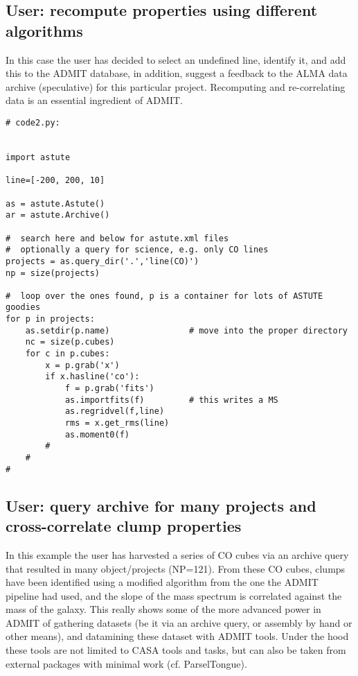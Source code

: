 \documentclass[preprint]{aastex} %
\begin{document}
\subsection{User: recompute properties using different algorithms}

In this case the user has decided to select an undefined line, identify it, 
and add this to the ADMIT database, in addition, suggest a feedback to the ALMA data archive
(speculative) for this particular project.
Recomputing and re-correlating data is an essential ingredient of ADMIT.

\footnotesize
\begin{verbatim}
# code2.py:


import astute

line=[-200, 200, 10]

as = astute.Astute()
ar = astute.Archive()

#  search here and below for astute.xml files
#  optionally a query for science, e.g. only CO lines
projects = as.query_dir('.','line(CO)')
np = size(projects)

#  loop over the ones found, p is a container for lots of ASTUTE goodies
for p in projects:
    as.setdir(p.name)                # move into the proper directory
    nc = size(p.cubes)
    for c in p.cubes:
        x = p.grab('x')
        if x.hasline('co'):
            f = p.grab('fits')
            as.importfits(f)         # this writes a MS
            as.regridvel(f,line)
            rms = x.get_rms(line)
            as.moment0(f)
        #
    #
#

\end{verbatim}
\normalsize


\subsection{User: query archive for many projects and cross-correlate clump properties}

In this example the user has harvested a series of CO cubes via
an archive query that resulted in many object/projects (NP=121).
From these CO cubes, clumps have been identified using a modified
algorithm from the one the ADMIT pipeline had used, and the slope
of the mass spectrum is correlated against the mass of the galaxy.
This really shows some of the more advanced power in ADMIT
of gathering datasets (be it via an archive query, or assembly by
hand or other means), and datamining these dataset with ADMIT tools.
Under the hood these tools are not limited to CASA tools and tasks, but
can also be taken from external packages with minimal work (cf.
ParselTongue).
\end{document}
